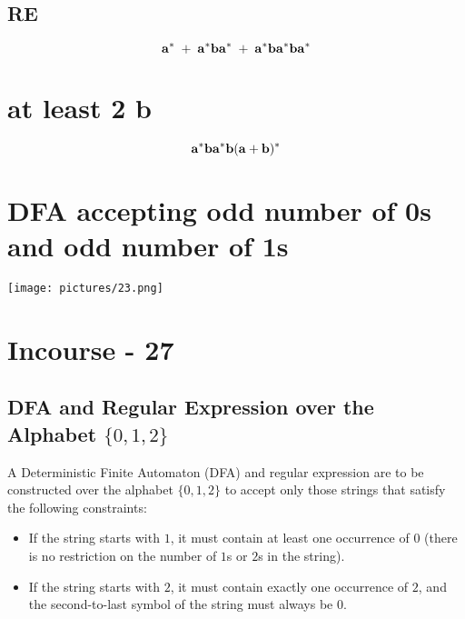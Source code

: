 \documentclass[8pt]{article}
\begin{document}
\subsection{RE}
\[
\Huge \mathbf{
a^{*} \;+\; a^{*} b a^{*} \;+\; a^{*} b a^{*} b a^{*}
}
\]



\section{at least 2 b}
\[
\Huge \mathbf{
a^{*} b a^{*} b (a+b)^{*}
}
\]

\section{DFA accepting odd number of 0s and odd number of 1s}
\begin{center}
    \texttt{[image: pictures/23.png]} %
\end{center}
\section{Incourse - 27}
\subsection{ DFA and Regular Expression over the Alphabet $\{0,1,2\}$}

\large{
A Deterministic Finite Automaton (DFA) and regular expression are to be constructed over the
alphabet $\{0,1,2\}$ to accept only those strings that satisfy the following constraints:

\begin{itemize}
    \item If the string starts with $1$, it must contain at least one occurrence of $0$ 
          (there is no restriction on the number of $1$s or $2$s in the string).
    \item If the string starts with $2$, it must contain exactly one occurrence of $2$, 
          and the second-to-last symbol of the string must always be $0$.
\end{itemize}
}
\end{document}
